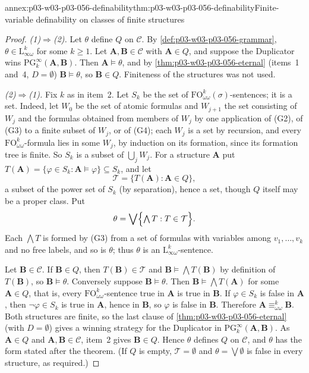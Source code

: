 \begin{annexitem}{annex:p03-w03-p03-056-definability}{thm:p03-w03-p03-056-definability}{Finite-variable definability on classes of finite structures}
\begin{proof}
\emph{(1)\(\Rightarrow\)(2).} Let \(\theta\) define \(Q\) on \(\mathcal C\).
By \cref{def:p03-w03-p03-056-grammar}, \(\theta\in\mathrm{L}^k_{\infty\omega}\)
for some \(k\geq1\). Let \(\mathbf A,\mathbf B\in\mathcal C\) with
\(\mathbf A\in Q\), and suppose the Duplicator wins
\(\mathrm{PG}^\infty_k(\mathbf A,\mathbf B)\). Then
\(\mathbf A\models\theta\), and by \cref{thm:p03-w03-p03-056-eternal}
(items~1 and~4, \(D=\emptyset\)) \(\mathbf B\models\theta\), so
\(\mathbf B\in Q\). Finiteness of the structures was not used.

\emph{(2)\(\Rightarrow\)(1).} Fix \(k\) as in item~2. Let \(S_k\) be the set of
\(\mathrm{FO}^k_{\omega\omega}(\sigma)\)-sentences; it is a set. Indeed, let \(W_0\) be the set of
atomic formulas and \(W_{j+1}\) the set consisting of \(W_j\) and the formulas obtained from members of
\(W_j\) by one application of (G2), of (G3) to a finite subset of \(W_j\), or
of (G4); each \(W_j\) is a set by recursion, and every
\(\mathrm{FO}^k_{\omega\omega}\)-formula lies in some \(W_j\), by induction on
its formation, since its formation tree is finite. So \(S_k\) is a subset of
\(\bigcup_jW_j\). For a
structure \(\mathbf A\) put
\(T(\mathbf A)=\{\varphi\in S_k:\mathbf A\models\varphi\}\subseteq S_k\), and
let
\[
 \mathcal T=\{T(\mathbf A):\mathbf A\in Q\},
\]
a subset of the power set of \(S_k\) (by separation), hence a set, though
\(Q\) itself may be a proper class. Put
\[
 \theta=\bigvee\Bigl\{\textstyle\bigwedge T:T\in\mathcal T\Bigr\}.
\]
Each \(\bigwedge T\) is formed by (G3) from a set of formulas with variables
among \(v_1,\ldots,v_k\) and no free labels, and so is \(\theta\); thus
\(\theta\) is an \(\mathrm{L}^k_{\infty\omega}\)-sentence.

Let \(\mathbf B\in\mathcal C\). If \(\mathbf B\in Q\), then
\(T(\mathbf B)\in\mathcal T\) and \(\mathbf B\models\bigwedge T(\mathbf B)\)
by definition of \(T(\mathbf B)\), so \(\mathbf B\models\theta\). Conversely
suppose \(\mathbf B\models\theta\). Then \(\mathbf B\models\bigwedge
T(\mathbf A)\) for some \(\mathbf A\in Q\), that is, every
\(\mathrm{FO}^k_{\omega\omega}\)-sentence true in \(\mathbf A\) is true in
\(\mathbf B\). If \(\varphi\in S_k\) is false in \(\mathbf A\), then
\(\neg\varphi\in S_k\) is true in \(\mathbf A\), hence in \(\mathbf B\), so
\(\varphi\) is false in \(\mathbf B\). Therefore
\(\mathbf A\equiv^k_{\omega\omega}\mathbf B\). Both structures are finite, so
the last clause of \cref{thm:p03-w03-p03-056-eternal} (with \(D=\emptyset\))
gives a winning strategy for the Duplicator in
\(\mathrm{PG}^\infty_k(\mathbf A,\mathbf B)\). As \(\mathbf A\in Q\) and
\(\mathbf A,\mathbf B\in\mathcal C\), item~2 gives \(\mathbf B\in Q\). Hence
\(\theta\) defines \(Q\) on \(\mathcal C\), and \(\theta\) has the form
stated after the theorem. (If \(Q\) is empty, \(\mathcal T=\emptyset\) and
\(\theta=\bigvee\emptyset\) is false in every structure, as required.)


\end{proof}
\end{annexitem}
